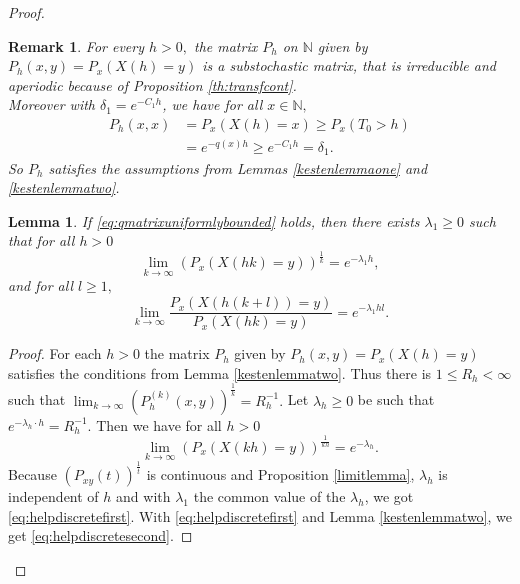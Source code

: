 \documentclass[12pt,a4paper]{scrartcl}
\newtheorem{lemma}[theorem]{Lemma}
\newtheorem {remark}[theorem]{Remark}
\numberwithin{equation}{section}
\newcommand{\N}{\mathbb{N}} %
\begin{document}
\begin{proof}
\begin{remark}
For every $h > 0,$ the matrix $P_h$ on $\N$ given by $P_h\left(x,y\right) = P_x\left(X\left(h\right)=y \right)$ is a substochastic matrix, that is irreducible and aperiodic because of Proposition \ref{th:transfcont}.\\
Moreover with $\delta_1 = e^{-C_1 h}$, we have for all $x \in \N,$
\begin{align*}
P_h\left(x,x\right) &= P_x\left(X\left(h\right)=x \right) \geq P_x\left(T_0 > h \right) \\
&= e^{-q\left(x\right)h} \geq e^{-C_1 h} = \delta_1.
\end{align*}
So $P_h$ satisfies the assumptions from Lemmas \ref{kestenlemmaone} and \ref{kestenlemmatwo}.

\end{remark}


\begin{lemma} \label{th:thelimitsdiscrete}
If \eqref{eq:qmatrixuniformlybounded} holds, then there exists $\lambda_1 \geq 0$ such that for all $h > 0$
\begin{equation} \label{eq:helpdiscretefirst}
\lim_{k \to \infty} \left(P_x\left(X\left(hk\right)=y \right) \right)^{\frac{1}{k}} = e^{-\lambda_1 h},
\end{equation}
and for all $l \geq 1,$
\begin{equation} \label{eq:helpdiscretesecond}
\lim_{k \to \infty} \frac{P_x\left(X\left(h\left(k+l\right)\right)=y\right)}{P_x\left(X\left(hk\right)=y\right)} = e^{-\lambda_1 h l}.
\end{equation} 
\end{lemma}
\begin{proof}
For each $h >0$ the matrix $P_h$ given by $P_h\left(x,y\right) = P_x\left(X\left(h\right) = y\right)$ satisfies the conditions from Lemma \ref{kestenlemmatwo}. Thus there is $1 \leq R_h < \infty$ such that $\lim_{k \to \infty}  \left(P_h^{\left(k\right)}\left(x,y\right)\right)^{\frac{1}{k}} = R_h^{-1}.$ Let $\lambda_h \geq 0$ be such that $e^{-\lambda_h \cdot h} = R_h^{-1}. $ Then we have for all $ h > 0$
$$ \lim_{k \to \infty} \left(P_x\left(X\left(kh \right)=y \right) \right)^{\frac{1}{kh}} = e^{-\lambda_h}. $$
Because $\left(P_{xy}\left(t\right)\right)^{\frac{1}{t}}$ is continuous and Proposition \ref{limitlemma}, $\lambda_h$ is independent of $h$ and with $\lambda_1$ the common value of the $\lambda_h$, we got \eqref{eq:helpdiscretefirst}.
With \eqref{eq:helpdiscretefirst} and Lemma \ref{kestenlemmatwo}, we get \eqref{eq:helpdiscretesecond}.



\end{proof}
\end{proof}
\end{document}
